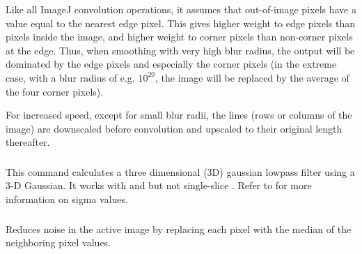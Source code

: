 Like all ImageJ convolution operations, it assumes that out-of-image
pixels have a value equal to the nearest edge pixel. This gives higher
weight to edge pixels than pixels inside the image, and higher weight
to corner pixels than non-corner pixels at the edge. Thus, when smoothing
with very high blur radius, the output will be dominated by the edge
pixels and especially the corner pixels (in the extreme case, with
a blur radius of e.g. $10^{20}$, the image will be replaced by the
average of the four corner pixels).

For increased speed, except for small blur radii, the lines (rows
or columns of the image) are downscaled before convolution and upscaled
to their original length thereafter.




\subsubsection[\protect\userinterface{Gaussian Blur 3D\ldots{}}]{\protect{}\label{sub:Gaussian-Blur-3D...}}

This command calculates a three dimensional (3D)
gaussian lowpass filter using a 3-D Gaussian. It works with 
and  but not single-slice .
Refer to  for more information on sigma
values.




\subsubsection[\protect\userinterface{Median\ldots{}}]{\protect{}\label{sub:Median...}}

Reduces noise in the active image by replacing each pixel with the
median of the neighboring pixel values.


